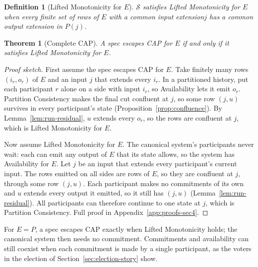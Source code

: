 \documentclass[sigconf]{cidr-2027}
\newtheorem{theorem}{Theorem}
\newtheorem{definition}{Definition}
\theoremstyle{remark}
\newcommand{\commitment}{commitment\xspace}
\newcommand{\commitments}{commitments\xspace}
\newcommand{\Commitments}{Commitments\xspace}
\newcommand{\inrel}{extends\xspace}          %
\newcommand{\indesc}{input extension\xspace} %
\newcommand{\outrel}{extends\xspace}          %
\newcommand{\outnoun}{output extension\xspace}%
\newcommand{\Spec}{\mathcal{S}}
\newcommand{\fiber}[1]{P(#1)}
\begin{document}
\begin{definition}[Lifted Monotonicity for $E$]
\label{def:lm-for-A}
\textcolor{reviewed}{$\Spec$ satisfies \emph{Lifted Monotonicity for $E$} when every finite set of
rows of $E$ with a common \indesc $j$ has a common \outnoun in $\fiber{j}$.}
\end{definition}

\begin{theorem}[Complete CAP]
\label{thm:complete-cap}
\textcolor{reviewed}{A spec escapes CAP for $E$ if and only if it satisfies Lifted Monotonicity for
$E$.}
\end{theorem}

\begin{proof}[Proof sketch]
\textcolor{reviewed}{First assume the spec escapes CAP for $E$.} \textcolor{reviewed}{Take finitely many rows
$(i_r,o_r)$ of $E$ and an input $j$ that \inrel every $i_r$.} \textcolor{reviewed}{In a partitioned
history, put each participant $r$ alone on a side with input $i_r$, so
Availability lets it emit $o_r$.} \textcolor{reviewed}{Partition Consistency makes the final cut
confluent at $j$, so some row $(j,u)$ survives in every participant's state
(Proposition~\ref{prop:confluence}).} \textcolor{reviewed}{By Lemma~\ref{lem:run-residual}, $u$ \outrel every $o_r$, so the rows are confluent at $j$, which is Lifted Monotonicity for $E$.}

\textcolor{reviewed}{Now assume Lifted Monotonicity for $E$.} The canonical system's participants
never wait: each can emit any output of $E$ that its state allows, so the
system has Availability for $E$. \textcolor{reviewed}{Let $j$ be an input that \inrel every
participant's current input.} \textcolor{reviewed}{The rows emitted on all sides are rows of $E$, so they are confluent at $j$, through some row $(j,u)$.} Each participant makes no
\commitments of its own and $u$ \outrel every output it emitted, so it still
has $(j,u)$ (Lemma~\ref{lem:run-residual}). \textcolor{reviewed}{All participants can therefore
continue to one state at $j$, which is Partition Consistency.} Full proof in
Appendix~\ref{app:proofs-sec4}.
\end{proof}

\textcolor{reviewed}{For $E=P$, a spec escapes CAP exactly when Lifted Monotonicity holds; the canonical system then needs no \commitment.} \Commitments and availability can still coexist when each \commitment is made by a single participant, as the voters in the election of Section~\ref{sec:election-story} show.
\end{document}
